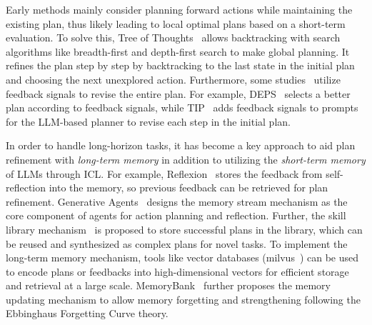 Early methods mainly consider planning forward actions while maintaining the existing plan, thus likely leading to local optimal plans based on a short-term evaluation.
To solve this, Tree of Thoughts~\cite{Yao-2023-arXiv-tree} allows backtracking with search algorithms like breadth-first and depth-first search to make global planning.
It refines the plan step by step by backtracking to the last state in the initial plan and choosing the next unexplored action.
Furthermore, some studies~\cite{Wang-2023-arXiv-describe, Lu-2023-arXiv-multimodal} utilize feedback signals to revise the entire plan.
For example, DEPS~\cite{Wang-2023-arXiv-describe} selects a better plan according to feedback signals, while TIP~\cite{Lu-2023-arXiv-multimodal} adds feedback signals to prompts for the LLM-based planner to revise each step in the initial plan.

In order to handle long-horizon tasks, it has become a key approach to aid plan refinement with \emph{long-term memory} in addition to utilizing the \emph{short-term memory} of LLMs through ICL.
For example, Reflexion~\cite{Shinn-2023-arXiv-Reflexion} stores the feedback from self-reflection into the memory, so previous feedback can be retrieved for plan refinement.
Generative Agents~\cite{Park-arxiv-2023-Generative} designs the memory stream mechanism as the core component of agents for action planning and reflection.
Further, the skill library mechanism~\cite{Wang-2023-arXiv-voyager, Sun-2023-arXiv-adaplanner} is proposed to store successful plans in the library, which can be reused and synthesized as complex plans for novel tasks.
To implement the long-term memory mechanism, tools like vector databases (\eg milvus~\cite{Wang-2021-ICDM-Milvus}) can be used to encode plans or feedbacks into high-dimensional vectors for efficient storage and retrieval at a large scale.
MemoryBank~\cite{Zhong-2023-arxiv-MemoryBank} further proposes the memory updating mechanism to allow memory forgetting and strengthening following the Ebbinghaus Forgetting Curve theory.


